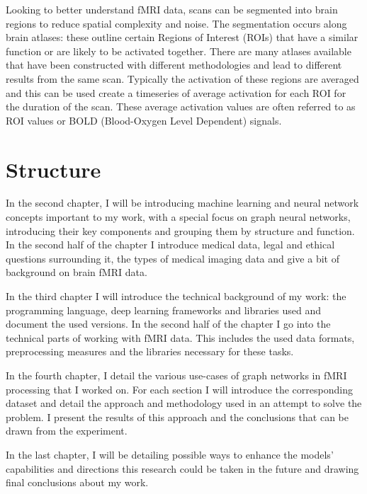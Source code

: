 Looking to better understand fMRI data, scans can be segmented into brain regions to reduce spatial complexity and noise. The segmentation occurs along brain atlases: these outline certain Regions of Interest (ROIs) that have a similar function or are likely to be activated together. There are many atlases available that have been constructed with different methodologies and lead to different results from the same scan. Typically the activation of these regions are averaged and this can be used create a timeseries of average activation for each ROI for the duration of the scan. These average activation values are often referred to as ROI values or BOLD (Blood-Oxygen Level Dependent) signals.



  

\section{Structure}

In the second chapter, I will be introducing machine learning and neural network concepts important to my work, with a special focus on graph neural networks, introducing their key components and grouping them by structure and function. In the second half of the chapter I introduce medical data, legal and ethical questions surrounding it, the types of medical imaging data and give a bit of background on brain fMRI data.

In the third chapter I will introduce the technical background of my work: the programming language, deep learning frameworks and libraries used and document the used versions. In the second half of the chapter I go into the technical parts of working with fMRI data. This includes the used data formats, preprocessing measures and the libraries necessary for these tasks.

In the fourth chapter, I detail the various use-cases of graph networks in fMRI processing that I worked on. For each section I will introduce the corresponding dataset and detail the approach and methodology used in an attempt to solve the problem. I present the results of this approach and the conclusions that can be drawn from the experiment.

In the last chapter, I will be detailing possible ways to enhance the models’ capabilities
and directions this research could be taken in the future and drawing final conclusions about my work.
